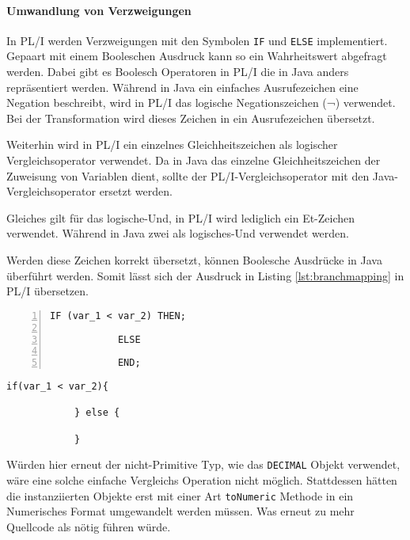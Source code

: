 \paragraph{Umwandlung von Verzweigungen}

In PL/I werden Verzweigungen mit den Symbolen \verb+IF+ und \verb+ELSE+ implementiert. 
Gepaart mit einem Booleschen Ausdruck kann so ein Wahrheitswert abgefragt werden.
Dabei gibt es Boolesch Operatoren in PL/I die in Java anders repräsentiert werden.
Während in Java ein einfaches Ausrufezeichen eine Negation beschreibt, wird in PL/I das logische Negationszeichen (¬) verwendet. Bei der Transformation wird dieses Zeichen in ein Ausrufezeichen übersetzt.

Weiterhin wird in PL/I ein einzelnes Gleichheitszeichen als logischer Vergleichsoperator verwendet. Da in Java das einzelne Gleichheitszeichen der Zuweisung von Variablen dient, sollte der PL/I-Vergleichsoperator mit den Java-Vergleichsoperator ersetzt werden.

Gleiches gilt für das logische-Und, in PL/I wird lediglich ein Et-Zeichen verwendet. Während in Java zwei als logisches-Und verwendet werden.

Werden diese Zeichen korrekt übersetzt, können Boolesche Ausdrücke in Java überführt werden.
Somit lässt sich der Ausdruck in Listing \ref{lst:branchmapping} in PL/I übersetzen.

\begin{minipage}[b]{0.5\linewidth}
	\centering
	\lstset{language=PL/I,label=SliceExaple}
	\begin{lstlisting}[frame=single, numbers=left, mathescape,%
		caption={Transformation deiner If-Else-Statements}, label={lst:branchmapping}]	
			IF (var_1 < var_2) THEN;
				
			ELSE
				
			END;
	\end{lstlisting}
\end{minipage}
\hspace{0.5cm}
\begin{minipage}[b]{0.5\linewidth}
	\centering
	\lstset{language=Java,label=SliceExaple}
	\begin{lstlisting}[frame=single, mathescape,%
		title={}]
			if(var_1 < var_2){
				
			} else {
				
			}
	\end{lstlisting}
\end{minipage} 

Würden hier erneut der nicht-Primitive Typ, wie das \verb+DECIMAL+ Objekt verwendet, wäre eine solche einfache Vergleichs Operation nicht möglich.
Stattdessen hätten die instanziierten Objekte erst mit einer Art \verb+toNumeric+ Methode in ein Numerisches Format umgewandelt werden müssen.
Was erneut zu mehr Quellcode als nötig führen würde.

